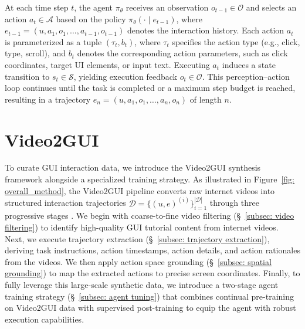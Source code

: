 \documentclass{article}
\theoremstyle{plain}
\theoremstyle{definition}
\theoremstyle{remark}
\begin{document}
At each time step $t$, the agent $\pi_\theta$ receives an observation $o_{t-1} \in \mathcal{O}$ and selects an action $a_t \in \mathcal{A}$ based on the policy $\pi_\theta(\cdot \mid e_{t-1})$, where
$e_{t-1} = (u, a_1, o_1, \ldots, a_{t-1}, o_{t-1})$ denotes the interaction history.
Each action $a_t$ is parameterized as a tuple $(\tau_t, b_t)$, where $\tau_t$ specifies the action type (e.g., click, type, scroll), and $b_t$ denotes the corresponding action parameters, such as click coordinates, target UI elements, or input text.
Executing $a_t$ induces a state transition to $s_t \in \mathcal{S}$, yielding execution feedback $o_t \in \mathcal{O}$.
This perception–action loop continues until the task is completed or a maximum step budget is reached, resulting in a trajectory
$e_n = (u, a_1, o_1, \ldots, a_n, o_n)$ of length $n$.

\section{Video2GUI}
To curate GUI interaction data,
we introduce the Video2GUI synthesis framework alongside a specialized training strategy. As illustrated in Figure~\ref{fig: overall_method}, the Video2GUI pipeline converts raw internet videos into structured interaction trajectories $\mathcal{D}=\{(u,e)^{(i)}\}_{i=1}^{|\mathcal{D}|}$ through three progressive stages .
We begin with coarse-to-fine video filtering (\S~\ref{subsec: video filtering}) to identify high-quality GUI tutorial content from internet videos.
Next, we execute trajectory extraction (\S~\ref{subsec: trajectory extraction}), deriving task instructions, action timestamps, action details, and action rationales from the videos.
We then apply action space grounding (\S~\ref{subsec: spatial grounding}) to map the extracted actions to precise screen coordinates. Finally, to fully leverage this large-scale synthetic data, we introduce a two-stage agent training strategy (\S~\ref{subsec: agent tuning}) that combines continual pre-training on Video2GUI data with supervised post-training to equip the agent with robust execution capabilities.
\end{document}
